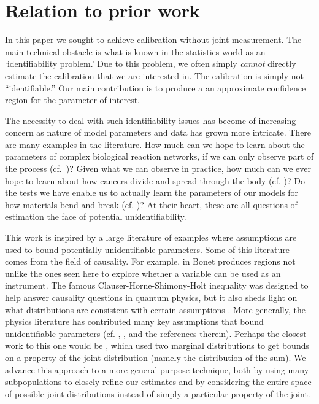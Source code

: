 \section{Relation to prior work}

In this paper we sought to achieve calibration without joint measurement.  The main technical obstacle is what is known in the statistics world as an `identifiability problem.'  Due to this problem, we often simply \emph{cannot} directly estimate the calibration that we are interested in.  The calibration is simply not ``identifiable.''  Our main contribution is to produce a an approximate confidence region for the parameter of interest.  

The necessity to deal with such identifiability issues has become of increasing concern as nature of model parameters and data has grown more intricate.  There are many examples in the literature.  How much can we hope to learn about the parameters of complex biological reaction networks, if we can only observe part of the process (cf.\ \cite{raue2009structural})?   Given what we can observe in practice, how much can we ever hope to learn about how cancers divide and spread through the body (cf. \cite{brouwer2017parameter,luebeck2002multistage})?  Do the tests we have enable us to actually learn the parameters of our models for how materials bend and break (cf. \cite{hartmann2018identifiability})?   At their heart, these are all questions of estimation the face of potential unidentifiability. 

This work is inspired by a large literature of examples where assumptions are used to bound potentially unidentifiable parameters.  Some of this literature comes from the field of causality.  For example, in \cite{bonet2001instrumentality} Bonet produces regions not unlike the ones seen here to explore whether a variable can be used as an instrument.  The famous Clauser-Horne-Shimony-Holt inequality was designed to help answer causality questions in quantum physics, but it also sheds light on what distributions are consistent with certain assumptions \cite{clauser1969proposed}.  More generally, the physics literature has contributed many key assumptions that bound unidentifiable parameters (cf. \cite{chaves2014inferring}, \cite{kela2017semidefinite}, and the references therein).  Perhaps the closest work to this one would be \cite{makarov1982estimates}, which used two marginal distributions to get bounds on a property of the joint distribution (namely the distribution of the sum).  We advance this approach to a more general-purpose technique, both by using many subpopulations to closely refine our estimates and by considering the entire space of possible joint distributions instead of simply a particular property of the joint.  

